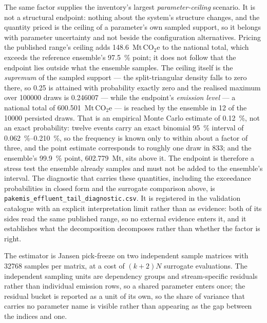 \documentclass[essd]{copernicus}
\begin{document}
The same factor supplies the inventory's largest \emph{parameter-ceiling} scenario. It is not a structural endpoint: nothing about the system's structure changes, and the quantity priced is the ceiling of a parameter's own sampled support, so it belongs with parameter uncertainty and not beside the configuration alternatives. Pricing the published range's ceiling adds \SI{148.6}{\mega\tonne}\,CO$_2$e to the national total, which exceeds the reference ensemble's \SI{97.5}{\percent} point; it does not follow that the endpoint lies outside what the ensemble samples. The ceiling itself is the \emph{supremum} of the sampled support --- the split-triangular density falls to zero there, so \num{0.25} is attained with probability exactly zero and the realised maximum over \num{100000} draws is \num{0.246007} --- while the endpoint's \emph{emission level} --- a national total of \SI{600.501}{\mega\tonne}\,CO$_2$e --- is reached by the ensemble in \num{12} of the \num{10000} persisted draws. That is an empirical Monte Carlo estimate of \SI{0.12}{\percent}, not an exact probability: twelve events carry an exact binomial \SI{95}{\percent} interval of \SIrange{0.062}{0.210}{\percent}, so the frequency is known only to within about a factor of three, and the point estimate corresponds to roughly one draw in \num{833}; and the ensemble's \SI{99.9}{\percent} point, \SI{602.779}{\mega\tonne}, sits above it. The endpoint is therefore a stress test the ensemble already samples and must not be added to the ensemble's interval. The diagnostic that carries these quantities, including the exceedance probabilities in closed form and the surrogate comparison above, is \texttt{pakemis\_effluent\_tail\_diagnostic.csv}. It is registered in the validation catalogue with an explicit interpretation limit rather than as evidence: both of its sides read the same published range, so no external evidence enters it, and it establishes what the decomposition decomposes rather than whether the factor is right.

The estimator is Jansen pick-freeze on two independent sample matrices with \num{32768} samples per matrix, at a cost of $(k+2)N$ surrogate evaluations. The independent sampling units are dependency groups and stream-specific residuals rather than individual emission rows, so a shared parameter enters once; the residual bucket is reported as a unit of its own, so the share of variance that carries no parameter name is visible rather than appearing as the gap between the indices and one.
\end{document}
